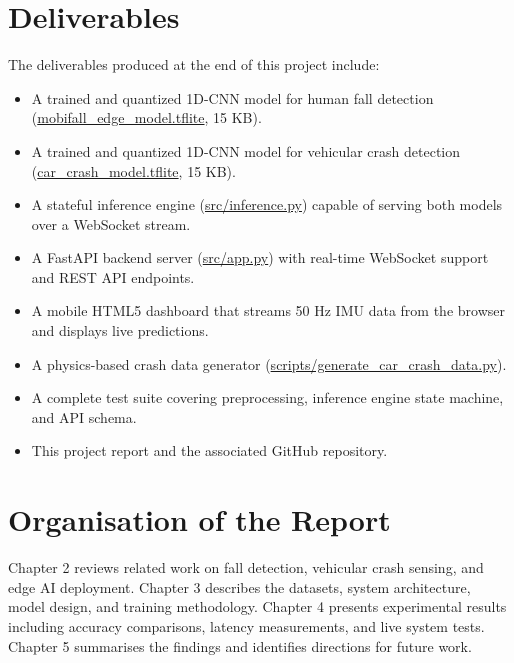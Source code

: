 \section{Deliverables}
\label{sec:deliverables}

The deliverables produced at the end of this project include:
\begin{itemize}
    \item A trained and quantized 1D-CNN model for human fall detection (\url{mobifall_edge_model.tflite}, 15 KB).
    \item A trained and quantized 1D-CNN model for vehicular crash detection (\url{car_crash_model.tflite}, 15 KB).
    \item A stateful inference engine (\url{src/inference.py}) capable of serving both models over a WebSocket stream.
    \item A FastAPI backend server (\url{src/app.py}) with real-time WebSocket support and REST API endpoints.
    \item A mobile HTML5 dashboard that streams 50 Hz IMU data from the browser and displays live predictions.
    \item A physics-based crash data generator (\url{scripts/generate_car_crash_data.py}).
    \item A complete test suite covering preprocessing, inference engine state machine, and API schema.
    \item This project report and the associated GitHub repository.
\end{itemize}

\section{Organisation of the Report}
\label{sec:organisation}

Chapter 2 reviews related work on fall detection, vehicular crash sensing, and edge AI deployment. Chapter 3 describes the datasets, system architecture, model design, and training methodology. Chapter 4 presents experimental results including accuracy comparisons, latency measurements, and live system tests. Chapter 5 summarises the findings and identifies directions for future work.
